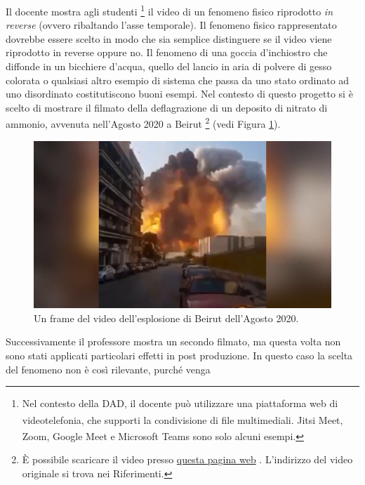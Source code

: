 \documentclass{report} \usepackage[T1]{fontenc} \usepackage[italian]{babel}
\begin{document}
Il docente mostra agli studenti
\footnote{
Nel contesto della DAD, il docente può utilizzare
una piattaforma web di videotelefonia, che supporti la condivisione
di file multimediali. Jitsi Meet\textsuperscript{\textregistered},
Zoom\textsuperscript{\textregistered},
Google Meet\textsuperscript{\textregistered} e
Microsoft Teams\textsuperscript{\textregistered}
sono solo alcuni esempi.
}
il video di un fenomeno fisico riprodotto \emph{in reverse} (ovvero ribaltando
l'asse temporale). Il fenomeno fisico rappresentato dovrebbe essere scelto
in modo che sia semplice distinguere se il video viene
riprodotto in reverse oppure no.
Il fenomeno di una goccia d'inchiostro che diffonde in un bicchiere
d'acqua, quello del lancio in aria di polvere di gesso colorata
o qualsiasi altro esempio di sistema che passa da uno stato
ordinato ad uno disordinato costitutiscono buoni esempi.
Nel contesto di questo progetto si è scelto di mostrare
il filmato della deflagrazione di un deposito di nitrato
di ammonio, avvenuta nell'Agosto 2020 a Beirut
\footnote{
          \`E possibile scaricare il video presso
          \textcolor{blue}{\href{https://github.com/savaroskij/PED1/blob/master/progetto_finale/media/video/beirut_explosion_reverse.mp4?raw=true}{questa pagina web}}
          . L'indirizzo del video originale si trova nei Riferimenti\cite{beirut}.
}
(vedi Figura \ref{fig:beirut_explosion}).
\begin{figure}
\centering
  \includegraphics[width=\textwidth]{beirut_explosion}
  \caption{Un frame del video dell'esplosione di Beirut dell'Agosto 2020.}
  \label{fig:beirut_explosion}
\end{figure}
Successivamente il professore mostra un secondo filmato, ma questa
volta non sono stati applicati particolari effetti in post produzione.
In questo caso la scelta del fenomeno non è così rilevante, purché venga
\end{document}
